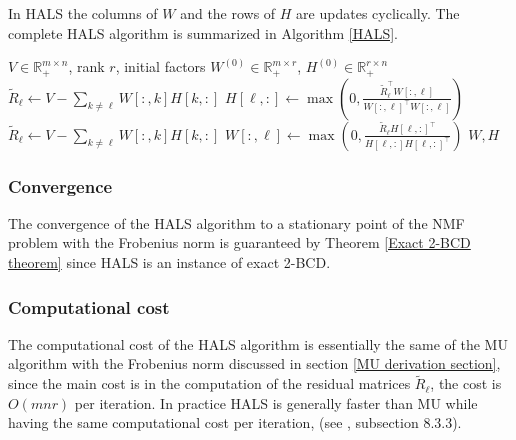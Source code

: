\par
In HALS the columns of $W$ and the rows of $H$ are updates cyclically.
The complete HALS algorithm is summarized in Algorithm \ref{HALS}.
\begin{algorithm}
    \caption{Hierarchical Alternating Least Squares for NMF}
    \label{HALS}
    \begin{algorithmic}[1]
        \Require \( V \in \mathbb{R}_+^{m \times n} \), rank \( r \), initial factors \( W^{(0)} \in \mathbb{R}_+^{m \times r} \), \( H^{(0)} \in \mathbb{R}_+^{r \times n} \)
                \State \( \tilde{R}_{\ell} \leftarrow V - \sum_{k\not=\ell}W[:,k]H[k,:] \)
                \State \( H[\ell,:] \leftarrow \max\left(0, \frac{\tilde{R}_{\ell}^\top W[:,\ell]}{W[:,\ell]^\top W[:,\ell]} \right) \)
            \EndFor
                \State \( \tilde{R}_{\ell} \leftarrow V - \sum_{k\not=\ell}W[:,k]H[k,:] \)
                \State \( W[:,\ell] \leftarrow \max\left(0, \frac{\tilde{R}_{\ell} H[\ell,:]^\top}{H[\ell,:] H[\ell,:]^\top} \right) \)
            \EndFor
        \EndWhile
        \State \Return \( W, H \)
    \end{algorithmic}
\end{algorithm}
\subsubsection{Convergence}
The convergence of the HALS algorithm to a stationary point of the NMF problem with the Frobenius norm is guaranteed by Theorem \ref{Exact 2-BCD theorem} since HALS is an instance of exact 2-BCD.
\subsubsection{Computational cost}
The computational cost of the HALS algorithm is essentially the same of the MU algorithm with the Frobenius norm discussed in section \ref{MU derivation section}, since the main cost is in the computation of the residual matrices $\tilde{R}_{\ell}$,
the cost is $O(mnr)$ per iteration. In practice HALS is generally faster than MU while having the same computational cost per iteration, (see \cite{gillis2020nonnegative}, subsection 8.3.3).
